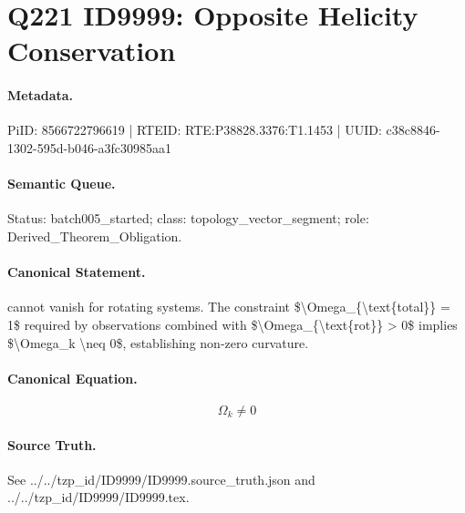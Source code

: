 \section*{Q221 ID9999: Opposite Helicity Conservation}
\paragraph{Metadata.}
PiID: 8566722796619 | RTEID: RTE:P38828.3376:T1.1453 | UUID: c38c8846-1302-595d-b046-a3fc30985aa1

\paragraph{Semantic Queue.}
Status: batch005\_started; class: topology\_vector\_segment; role: Derived\_Theorem\_Obligation.

\paragraph{Canonical Statement.}
cannot vanish for rotating systems. The constraint \$\textbackslash{}Omega\_\{\textbackslash{}text\{total\}\} = 1\$ required by observations combined with \$\textbackslash{}Omega\_\{\textbackslash{}text\{rot\}\} > 0\$ implies \$\textbackslash{}Omega\_k \textbackslash{}neq 0\$, establishing non-zero curvature.

\paragraph{Canonical Equation.}
\[
\Omega_k \neq 0
\]

\paragraph{Source Truth.}
See ../../tzp\_id/ID9999/ID9999.source\_truth.json and ../../tzp\_id/ID9999/ID9999.tex.
